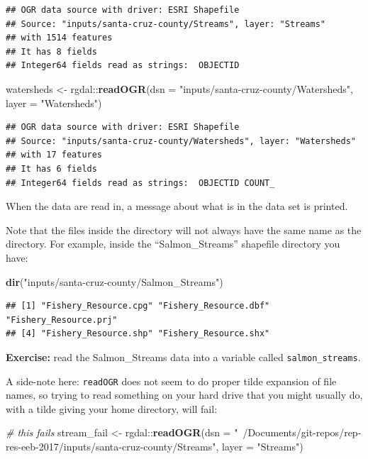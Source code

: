 \documentclass[]{book}
\newenvironment{Shaded}{\begin{snugshade}}{\end{snugshade}}
\newcommand{\KeywordTok}[1]{\textcolor[rgb]{0.13,0.29,0.53}{\textbf{{#1}}}}
\newcommand{\DataTypeTok}[1]{\textcolor[rgb]{0.13,0.29,0.53}{{#1}}}
\newcommand{\StringTok}[1]{\textcolor[rgb]{0.31,0.60,0.02}{{#1}}}
\newcommand{\CommentTok}[1]{\textcolor[rgb]{0.56,0.35,0.01}{\textit{{#1}}}}
\newcommand{\NormalTok}[1]{{#1}}
\theoremstyle{definition}
\theoremstyle{definition}
\theoremstyle{remark}
\begin{document}
\begin{verbatim}
## OGR data source with driver: ESRI Shapefile 
## Source: "inputs/santa-cruz-county/Streams", layer: "Streams"
## with 1514 features
## It has 8 fields
## Integer64 fields read as strings:  OBJECTID
\end{verbatim}

\begin{Shaded}
\begin{Highlighting}[]
\NormalTok{watersheds <-}\StringTok{ }\NormalTok{rgdal::}\KeywordTok{readOGR}\NormalTok{(}\DataTypeTok{dsn =} \StringTok{"inputs/santa-cruz-county/Watersheds"}\NormalTok{, }\DataTypeTok{layer =} \StringTok{"Watersheds"}\NormalTok{)}
\end{Highlighting}
\end{Shaded}

\begin{verbatim}
## OGR data source with driver: ESRI Shapefile 
## Source: "inputs/santa-cruz-county/Watersheds", layer: "Watersheds"
## with 17 features
## It has 6 fields
## Integer64 fields read as strings:  OBJECTID COUNT_
\end{verbatim}

When the data are read in, a message about what is in the data set is
printed.

Note that the files inside the directory will not always have the same
name as the directory. For example, inside the ``Salmon\_Streams''
shapefile directory you have:

\begin{Shaded}
\begin{Highlighting}[]
\KeywordTok{dir}\NormalTok{(}\StringTok{"inputs/santa-cruz-county/Salmon_Streams"}\NormalTok{)}
\end{Highlighting}
\end{Shaded}

\begin{verbatim}
## [1] "Fishery_Resource.cpg" "Fishery_Resource.dbf" "Fishery_Resource.prj"
## [4] "Fishery_Resource.shp" "Fishery_Resource.shx"
\end{verbatim}

\textbf{Exercise:} read the Salmon\_Streams data into a variable called
\texttt{salmon\_streams}.

A side-note here: \texttt{readOGR} does not seem to do proper tilde
expansion of file names, so trying to read something on your hard drive
that you might usually do, with a tilde giving your home directory, will
fail:

\begin{Shaded}
\begin{Highlighting}[]
\CommentTok{# this fails}
\NormalTok{stream_fail <-}\StringTok{ }\NormalTok{rgdal::}\KeywordTok{readOGR}\NormalTok{(}\DataTypeTok{dsn =} \StringTok{"~/Documents/git-repos/rep-res-eeb-2017/inputs/santa-cruz-county/Streams"}\NormalTok{, }
                              \DataTypeTok{layer =} \StringTok{"Streams"}\NormalTok{)}
\end{Highlighting}
\end{Shaded}
\end{document}
